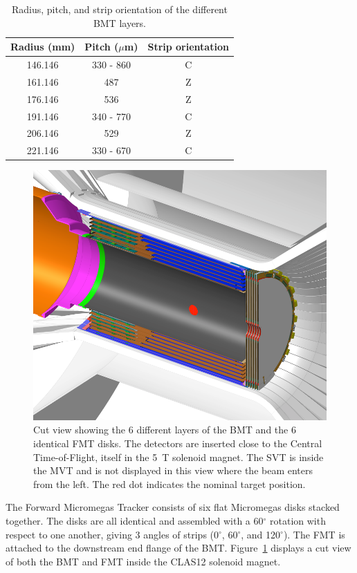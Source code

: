 \begin{table}
    \centering
    \begin{tabular}{|c|c|c|}
    \hline
    Radius (mm) & Pitch ($\mu$m) & Strip orientation \\
    \hline
    146.146 & 330 - 860 & C \\
    161.146 & 487 & Z \\
    176.146 & 536 & Z \\
    191.146 & 340 - 770 & C \\
    206.146 & 529 & Z \\
    221.146 & 330 - 670 & C \\
    \hline
    \end{tabular}
    \caption{Radius, pitch, and strip orientation of the different BMT layers.}
    \label{tab:bmt_strips}
\end{table}

\begin{figure}[htb]
 \includegraphics[width=1.0\columnwidth,keepaspectratio]{images/fig1}
 \caption{Cut view showing the 6 different layers of the BMT and the 6 identical FMT disks. The detectors are inserted
   close to the Central Time-of-Flight, itself in the 5~T solenoid magnet. The SVT is inside the MVT and is not displayed in
   this view where the beam enters from the left. The red dot indicates the nominal target position.}
 \label{fig:mm-fig1}
\end{figure}

The Forward Micromegas Tracker consists of six flat Micromegas disks stacked together. The disks are all identical and
assembled with a 60$^\circ$ rotation with respect to one another, giving 3 angles of strips (0$^\circ$, 60$^\circ$, and
120$^\circ$). The FMT is attached to the downstream end flange of the BMT. Figure~\ref{fig:mm-fig1} displays a cut view
of both the BMT and FMT inside the CLAS12 solenoid magnet.

